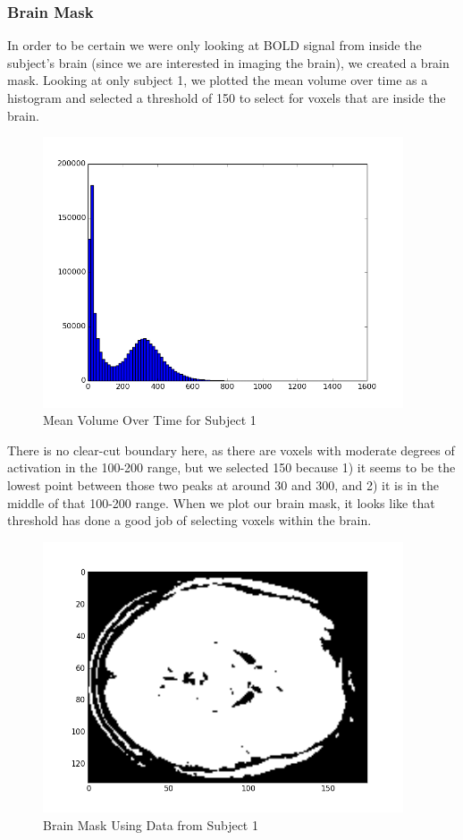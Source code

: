 \documentclass[11pt]{article}
\begin{document}
\subsubsection{Brain Mask}
In order to be certain we were only looking at BOLD signal from inside the subject's
brain (since we are interested in imaging the brain), we created a brain mask. Looking at only subject 1, we plotted 
the mean volume over time as a histogram and selected a threshold 
of 150 to select for voxels that are inside the brain.
\begin{figure}[H]                                                               
\caption{Mean Volume Over Time for Subject 1}                        
\centering                                                                      
\includegraphics[height=8cm]{subj_1_vol_mean_histogram.png}   
\end{figure}  
There is no clear-cut boundary here, as there are voxels with moderate degrees of activation in the 100-200 range, but we selected 150 because 1) it seems to be the
lowest point between those two peaks at around 30 and 300, and 2) it is in the middle
of that 100-200 range.  When we plot our brain mask, it 
looks like that threshold has done a good job of selecting voxels within the brain. 
\begin{figure}[H]                                                               
\caption{Brain Mask Using Data from Subject 1}    
\centering                                                                      
\includegraphics[height=8cm]{brain_mask.png}                            
\end{figure}  
\end{document}
